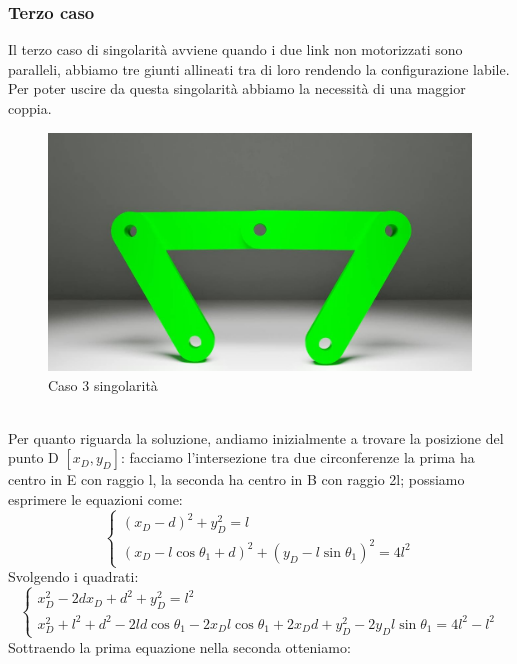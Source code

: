 \subsubsection*{Terzo caso}
Il terzo caso di singolarità avviene quando i due link non motorizzati sono paralleli, abbiamo tre giunti allineati tra di loro rendendo la configurazione labile. Per poter uscire da questa singolarità abbiamo la necessità di una maggior coppia.
\begin{figure}[ht]
	\begin{center}
		\includegraphics[scale=0.4]{Immagini/Singolarity/5}
		\caption{Caso 3 singolarità}
	\end{center}
\end{figure}
\\Per quanto riguarda la soluzione, andiamo inizialmente a trovare la posizione del punto D $[x_D,y_D]$: facciamo l'intersezione tra due circonferenze la prima ha centro in E con raggio l, la seconda ha centro in B con raggio 2l; possiamo esprimere le equazioni come:
\begin{equation}
	\begin{cases}
		(x_D-d)^2 +y_D^2= l \\
		(x_D-l\cos\theta_1+d)^2 + (y_D-l\sin\theta_1)^2 = 4l^2
	\end{cases}
\end{equation}
Svolgendo i quadrati:
\begin{equation*}
	\begin{cases}
	 x_D^2-2dx_D+d^2+y_D^2 = l^2 \\
	 x_D^2+ l^2 + d^2-2ld\cos\theta_1 -2x_Dl\cos\theta_1+2x_Dd + y_D^2-2y_Dl\sin\theta_1 = 4l^2-l^2
	\end{cases}
\end{equation*}
Sottraendo la prima equazione nella seconda otteniamo: 
